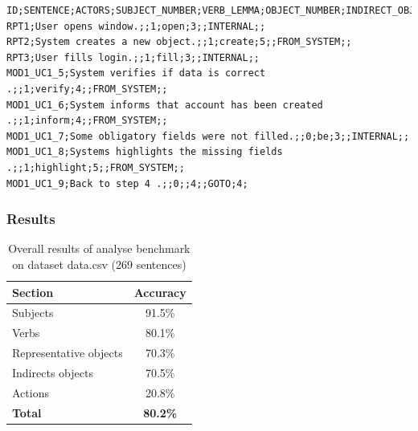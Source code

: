 \begin{table}[ht]   %
\begin{center}
    \begin{verbatim}      
ID;SENTENCE;ACTORS;SUBJECT_NUMBER;VERB_LEMMA;OBJECT_NUMBER;INDIRECT_OBJECT_NUMBER;ACTION_CODE;ACTION_PARAM1;ACTION_PARAM2
RPT1;User opens window.;;1;open;3;;INTERNAL;;
RPT2;System creates a new object.;;1;create;5;;FROM_SYSTEM;;
RPT3;User fills login.;;1;fill;3;;INTERNAL;;
MOD1_UC1_5;System verifies if data is correct .;;1;verify;4;;FROM_SYSTEM;;
MOD1_UC1_6;System informs that account has been created .;;1;inform;4;;FROM_SYSTEM;;
MOD1_UC1_7;Some obligatory fields were not filled.;;0;be;3;;INTERNAL;;
MOD1_UC1_8;Systems highlights the missing fields .;;1;highlight;5;;FROM_SYSTEM;;
MOD1_UC1_9;Back to step 4 .;;0;;4;;GOTO;4;
    \end{verbatim}
  \caption{Example input for benchmark plugin}
  \label{tab.benchmarkinput}
\end{center}
\end{table}      
      
\subsubsection{Results}
                        
\begin{table}[ht]   %
\begin{center}
    \begin{tabular}{|l|c|}
      \hline
      {\bf Section} & {\bf Accuracy} \\
      \hline
      Subjects               & 91.5\% \\
      Verbs                  & 80.1\% \\
      Representative objects & 70.3\% \\
      Indirects objects      & 70.5\% \\
      Actions                & 20.8\% \\
      \hline
      {\bf Total} & {\bf 80.2\%} \\
      \hline
    \end{tabular}
 \caption{Overall results of analyse benchmark on dataset data.csv (269 sentences)}
 \label{tab.benchmark}
\end{center}
\end{table}

